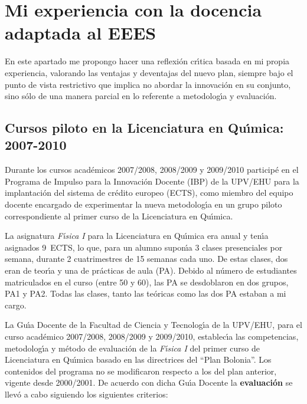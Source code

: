 \chapter{Mi experiencia con la docencia  adaptada al EEES}
\label{PD-miexp}

En  este apartado me propongo  hacer una reflexi\'{o}n cr\'{\i}tica
basada en mi propia experiencia,
 valorando las ventajas y deventajas del nuevo plan, siempre bajo el punto
de vista restrictivo que implica no abordar la innovaci\'{o}n en
su conjunto, sino s\'{o}lo de una manera parcial en lo referente
a metodolog\'{\i}a y evaluaci\'{o}n.

\section{Cursos piloto en la Licenciatura en Qu\'{\i}mica: 2007-2010}

Durante los cursos acad\'{e}micos 2007/2008,  2008/2009 y
2009/2010 
particip\'{e} en el Programa de Impulso para la Innovaci\'{o}n 
Docente  (IBP) de la UPV/EHU para la implantaci\'{o}n del sistema
de cr\'{e}dito europeo (ECTS), como miembro del equipo docente
encargado de experimentar la nueva metodolog\'{\i}a en un grupo 
piloto correspondiente al primer curso de la Licenciatura en Qu\'{\i}mica.


La asignatura {\it F\'{\i}sica I} para la Licenciatura  en Qu\'{\i}mica
era anual y ten\'{\i}a asignados 9~ECTS, lo que, para un alumno supon\'{\i}a 
 3 clases presenciales por semana, durante 2 cuatrimestres
de 15 semanas cada uno.
De estas clases, dos eran  de teor\'{\i}a
y una de pr\'{a}cticas de aula (PA). 
Debido al n\'{u}mero de 
estudiantes matriculados en el curso (entre 50 y 60), las PA
se  desdoblaron en dos grupos, PA1 y PA2. Todas las clases,
tanto las te\'{o}ricas como las dos PA estaban a mi cargo.

La Gu\'{\i}a Docente  de la Facultad de Ciencia y
Tecnolog\'{\i}a de la UPV/EHU, para el curso acad\'{e}mico 2007/2008,
2008/2009 y  2009/2010,
 establec\'{\i}a las competencias, metodolog\'{\i}a y m\'{e}todo de
evaluaci\'{o}n de la {\it F\'{\i}sica I} del primer curso de
Licenciatura en Qu\'{\i}mica basado en las directrices del ``Plan Bolonia''.
Los contenidos del programa no se modificaron respecto a
los del plan anterior, vigente desde 2000/2001.
De acuerdo con dicha Gu\'{\i}a Docente la {\bf evaluaci\'{o}n} se  llev\'{o} a 
cabo siguiendo los siguientes criterios:

